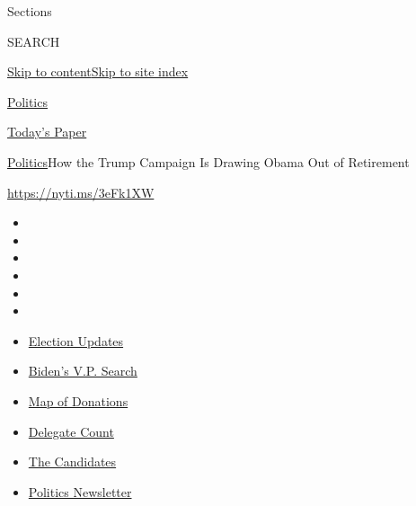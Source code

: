 Sections

SEARCH

\protect\hyperlink{site-content}{Skip to
content}\protect\hyperlink{site-index}{Skip to site index}

\href{https://www.nytimes.com/section/politics}{Politics}

\href{https://myaccount.nytimes.com/auth/login?response_type=cookie\&client_id=vi}{}

\href{https://www.nytimes.com/section/todayspaper}{Today's Paper}

\href{/section/politics}{Politics}\textbar{}How the Trump Campaign Is
Drawing Obama Out of Retirement

\url{https://nyti.ms/3eFk1XW}

\begin{itemize}
\item
\item
\item
\item
\item
\item
\end{itemize}

\begin{itemize}
\item
  \href{https://www.nytimes.com/2020/07/31/us/elections/biden-vs-trump.html?action=click\&pgtype=Article\&state=default\&region=TOP_BANNER\&context=storylines_menu}{Election
  Updates}
\item
  \href{https://www.nytimes.com/article/biden-vice-president-2020.html?action=click\&pgtype=Article\&state=default\&region=TOP_BANNER\&context=storylines_menu}{Biden's
  V.P. Search}
\item
  \href{https://www.nytimes.com/interactive/2020/07/24/us/politics/trump-biden-campaign-donors.html?action=click\&pgtype=Article\&state=default\&region=TOP_BANNER\&context=storylines_menu}{Map
  of Donations}
\item
  \href{https://www.nytimes.com/interactive/2020/us/elections/delegate-count-primary-results.html?action=click\&pgtype=Article\&state=default\&region=TOP_BANNER\&context=storylines_menu}{Delegate
  Count}
\item
  \href{https://www.nytimes.com/interactive/2019/us/politics/2020-presidential-candidates.html?action=click\&pgtype=Article\&state=default\&region=TOP_BANNER\&context=storylines_menu}{The
  Candidates}
\item
  \href{https://www.nytimes.com/newsletters/politics?action=click\&pgtype=Article\&state=default\&region=TOP_BANNER\&context=storylines_menu}{Politics
  Newsletter}
\end{itemize}


